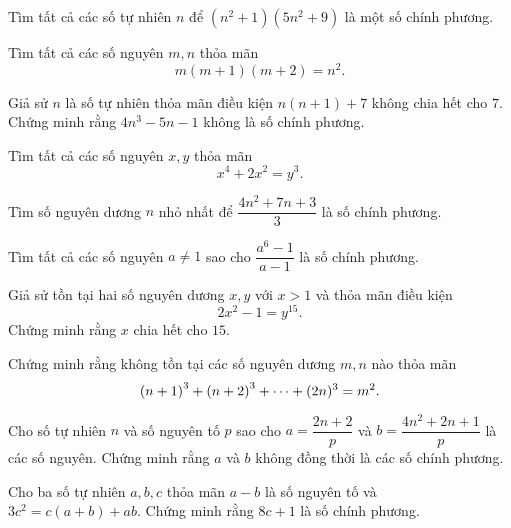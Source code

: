 \begin{btt}
Tìm tất cả các số tự nhiên $n$ để $\left(n^2+1\right)\left(5 n^2+9\right)$ là một số chính phương.
\end{btt}

\begin{btt}
Tìm tất cả các số nguyên $m,n$ thỏa mãn $$m(m+1)(m+2)=n^2.$$
\end{btt}


\begin{btt}
Giả sử $n$ là số tự nhiên thỏa mãn điều kiện $n(n+1)+7$ không chia hết cho $7.$ Chứng minh rằng $4n^3-5n-1$ không là số chính phương.
\end{btt} %

\begin{btt}
Tìm tất cả các số nguyên $x,y$ thỏa mãn $$x^4+2x^2=y^3.$$
\end{btt}

\begin{btt}
Tìm số nguyên dương $n$ nhỏ nhất để $\dfrac{4n^2+7n+3}{3}$ là số chính phương.
\end{btt}

\begin{btt}
Tìm tất cả các số nguyên $a\ne 1$ sao cho $\dfrac{a^6-1}{a-1}$ là số chính phương.
\end{btt}

\begin{btt}
Giả sử tồn tại hai số nguyên dương $x,y$ với $x>1$ và thỏa mãn điều kiện $$2x^{2}-1=y^{15}.$$ Chứng minh rằng $x$ chia hết cho $15.$
\end{btt}

\begin{btt}
Chứng minh rằng không tồn tại các số nguyên dương $m,n$ nào thỏa mãn
\[\left(\displaystyle n+1 \right)^3+\left(\displaystyle n+2 \right)^3+\cdots+(2n)^3=m^2.\]
\end{btt}

\begin{btt}
Cho số tự nhiên $n$ và số nguyên tố $p$ sao cho $a=\dfrac{2n+2}{p}$ và $b=\dfrac{4n^2+2n+1}{p}$ là các số nguyên. Chứng minh rằng $a$ và $b$ không đồng thời là các số chính phương.
\end{btt}

\begin{btt}
Cho ba số tự nhiên $a, b, c$ thỏa mãn $a-b$ là số nguyên tố và $3 c^{2}=c(a+b)+a b .$  Chứng minh rằng $8 c+1$ là số chính phương. 
\end{btt}

